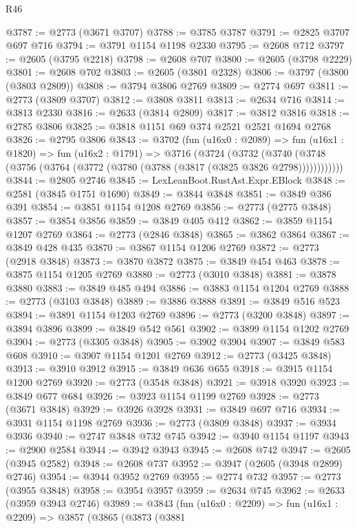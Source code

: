 \begin{lexlean}{R46}
\begin{coremodule}
@3787 := @2773 (@3671 @3707)
@3788 := @3785 @3787
@3791 := @2825 @3707 @697 @716
@3794 := @3791 @1154 @1198 @2330
@3795 := @2608 @712
@3797 := @2605 (@3795 @2218)
@3798 := @2608 @707
@3800 := @2605 (@3798 @2229)
@3801 := @2608 @702
@3803 := @2605 (@3801 @2328)
@3806 := @3797 (@3800 (@3803 @2809))
@3808 := @3794 @3806 @2769
@3809 := @2774 @697
@3811 := @2773 (@3809 @3707)
@3812 := @3808 @3811
@3813 := @2634 @716
@3814 := @3813 @2330
@3816 := @2633 (@3814 @2809)
@3817 := @3812 @3816
@3818 := @2785 @3806
@3825 := @3818 @1151 @69 @374 @2521 @2521 @1694 @2768
@3826 := @2795 @3806
@3843 := @3702
    (fun (u16x0 : @2089) =>
    fun (u16x1 : @1820) =>
    fun (u16x2 : @1791) =>
    @3716
      (@3724
        (@3732
          (@3740 (@3748 (@3756 (@3764 (@3772 (@3780 (@3788 (@3817 (@3825 @3826 @2798))))))))))))
@3844 := @2805 @2746
@3845 := LexLeanBoot.RustAst.Expr.EBlock
@3848 := @2581 (@3845 @1751 @1690)
@3849 := @3844 @3848
@3851 := @3849 @386 @391
@3854 := @3851 @1154 @1208 @2769
@3856 := @2773 (@2775 @3848)
@3857 := @3854 @3856
@3859 := @3849 @405 @412
@3862 := @3859 @1154 @1207 @2769
@3864 := @2773 (@2846 @3848)
@3865 := @3862 @3864
@3867 := @3849 @428 @435
@3870 := @3867 @1154 @1206 @2769
@3872 := @2773 (@2918 @3848)
@3873 := @3870 @3872
@3875 := @3849 @454 @463
@3878 := @3875 @1154 @1205 @2769
@3880 := @2773 (@3010 @3848)
@3881 := @3878 @3880
@3883 := @3849 @485 @494
@3886 := @3883 @1154 @1204 @2769
@3888 := @2773 (@3103 @3848)
@3889 := @3886 @3888
@3891 := @3849 @516 @523
@3894 := @3891 @1154 @1203 @2769
@3896 := @2773 (@3200 @3848)
@3897 := @3894 @3896
@3899 := @3849 @542 @561
@3902 := @3899 @1154 @1202 @2769
@3904 := @2773 (@3305 @3848)
@3905 := @3902 @3904
@3907 := @3849 @583 @608
@3910 := @3907 @1154 @1201 @2769
@3912 := @2773 (@3425 @3848)
@3913 := @3910 @3912
@3915 := @3849 @636 @655
@3918 := @3915 @1154 @1200 @2769
@3920 := @2773 (@3548 @3848)
@3921 := @3918 @3920
@3923 := @3849 @677 @684
@3926 := @3923 @1154 @1199 @2769
@3928 := @2773 (@3671 @3848)
@3929 := @3926 @3928
@3931 := @3849 @697 @716
@3934 := @3931 @1154 @1198 @2769
@3936 := @2773 (@3809 @3848)
@3937 := @3934 @3936
@3940 := @2747 @3848 @732 @745
@3942 := @3940 @1154 @1197
@3943 := @2900 @2584
@3944 := @3942 @3943
@3945 := @2608 @742
@3947 := @2605 (@3945 @2582)
@3948 := @2608 @737
@3952 := @3947 (@2605 (@3948 @2899) @2746)
@3954 := @3944 @3952 @2769
@3955 := @2774 @732
@3957 := @2773 (@3955 @3848)
@3958 := @3954 @3957
@3959 := @2634 @745
@3962 := @2633 (@3959 @3943 @2746)
@3989 := @3843
    (fun (u16x0 : @2209) =>
    fun (u16x1 : @2209) =>
    @3857
      (@3865
        (@3873
          (@3881

\end{coremodule}
\end{lexlean}
